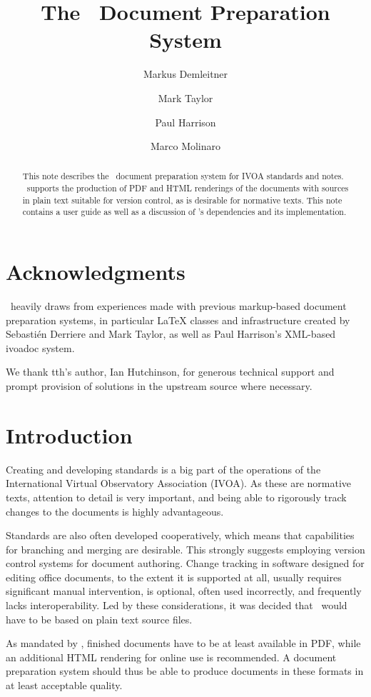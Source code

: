 \documentclass[11pt,a4paper]{ivoa}
\title{The \ivoatex\ Document Preparation System}
\author[http://www.ivoa.net/cgi-bin/twiki/bin/view/IVOA/MarkusDemleitner]{Markus Demleitner}
\author[http://www.ivoa.net/cgi-bin/twiki/bin/view/IVOA/MarkTaylor]{Mark Taylor}
\author[http://www.ivoa.net/cgi-bin/twiki/bin/view/IVOA/PaulHarrison]{Paul Harrison}
\author[http://www.ivoa.net/cgi-bin/twiki/bin/view/IVOA/MarcoMolinaro]{Marco Molinaro}
\begin{document}
\begin{abstract}
This note describes the \ivoatex\ document preparation system for IVOA
standards and notes.  \ivoatex\ supports the production of
PDF and HTML renderings of the documents with sources in
plain text suitable for version control, as is desirable for normative
texts.  This note contains a user guide as well as a discussion of 
\ivoatex's dependencies and its implementation.
\end{abstract}


\section*{Acknowledgments}

\ivoatex\ heavily draws from experiences made with previous markup-based
document preparation systems, in particular LaTeX classes and
infrastructure created by Sebasti\'en Derriere and Mark Taylor, as well
as Paul Harrison's XML-based ivoadoc system.

We thank tth's author, Ian Hutchinson, for generous technical support
and prompt provision of solutions in the upstream source where necessary.

\section{Introduction}

Creating and developing standards is a  big part of the operations of
the International Virtual Observatory Association (IVOA).
As these are normative texts, attention to detail is very important, and
being able to rigorously track changes to the documents is highly
advantageous.  

Standards are also often developed cooperatively, which means that
capabilities for branching and merging are desirable.  This strongly
suggests employing version control systems for document authoring.
Change tracking in software designed for editing office documents, to
the extent it is supported at all, usually requires significant
manual intervention, is optional, often used incorrectly, and frequently
lacks interoperability.  Led by these considerations, it was decided that
\ivoatex\ would have to be based on plain text source files.

As mandated by \citet{std:docSTD}, finished documents have to be at
least available in PDF, while an additional HTML rendering for online
use is recommended.  A document preparation system should thus be
able  to produce documents in these formats in at least acceptable
quality.
\end{document}
